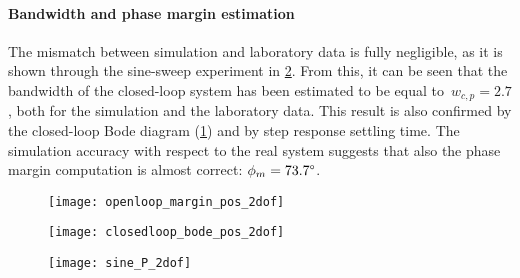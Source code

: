 \paragraph{Bandwidth and phase margin estimation}
The mismatch between simulation and laboratory data is fully negligible, as it is shown through the sine-sweep experiment in \cref{fig:sinesweep_pos_2dof}. From this, it can be seen that the bandwidth of the closed-loop system has been estimated to be equal to~$w_{c,p}=2.7$, both for the simulation and the laboratory data. This result is also confirmed by the closed-loop Bode diagram (\cref{fig:2dof_pos_bode}) and by step response settling time.
The simulation accuracy with respect to the real system suggests that also the phase margin computation is almost correct: $\phi_m = 73.7\degree$.
\begin{figure*}[h]
	\centering
	\begin{subfigure}{0.45\columnwidth}
		\texttt{[image: openloop\_margin\_pos\_2dof]}
	\end{subfigure}
	\begin{subfigure}{0.45\columnwidth}
		\texttt{[image: closedloop\_bode\_pos\_2dof]}
		\label{fig:2dof_pos_bode}
	\end{subfigure}
	\begin{subfigure}{0.9\columnwidth}
		\texttt{[image: sine\_P\_2dof]}
		\label{fig:sinesweep_pos_2dof}
	\end{subfigure}
	\caption{Bode and sine-sweep analyses}
\end{figure*}